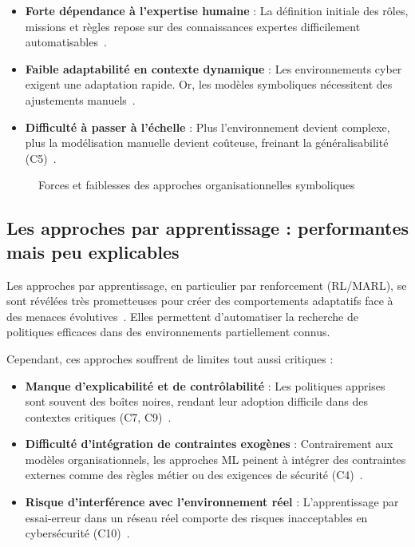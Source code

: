 \documentclass[ twoside,openright,titlepage,numbers=noenddot,headinclude,%
                footinclude=true,cleardoublepage=empty,abstractoff, %
                BCOR=5mm,paper=a4,fontsize=11pt,%
                french,american,%
                ]{scrreprt}
\begin{document}
\begin{itemize}
    \item \textbf{Forte dépendance à l'expertise humaine} : La définition initiale des rôles, missions et règles repose sur des connaissances expertes difficilement automatisables~\cite{Boella2008}.
    \item \textbf{Faible adaptabilité en contexte dynamique} : Les environnements cyber exigent une adaptation rapide. Or, les modèles symboliques nécessitent des ajustements manuels~\cite{Picard2005}.
    \item \textbf{Difficulté à passer à l'échelle} : Plus l'environnement devient complexe, plus la modélisation manuelle devient coûteuse, freinant la généralisabilité (C5)~\cite{Picard2006}.
\end{itemize}

\begin{figure}[H]
    \centering
    \caption{Forces et faiblesses des approches organisationnelles symboliques}
    \label{fig:limits_symbolic}
\end{figure}

\subsection{Les approches par apprentissage : performantes mais peu explicables}

Les approches par apprentissage, en particulier par renforcement (RL/MARL), se sont révélées très prometteuses pour créer des comportements adaptatifs face à des menaces évolutives~\cite{Hammar2023}. Elles permettent d'automatiser la recherche de politiques efficaces dans des environnements partiellement connus.

Cependant, ces approches souffrent de limites tout aussi critiques :

\begin{itemize}
    \item \textbf{Manque d'explicabilité et de contrôlabilité} : Les politiques apprises sont souvent des boîtes noires, rendant leur adoption difficile dans des contextes critiques (C7, C9)~\cite{Gunning2019}.
    \item \textbf{Difficulté d'intégration de contraintes exogènes} : Contrairement aux modèles organisationnels, les approches ML peinent à intégrer des contraintes externes comme des règles métier ou des exigences de sécurité (C4)~\cite{Chouldechova2018}.
    \item \textbf{Risque d'interférence avec l'environnement réel} : L'apprentissage par essai-erreur dans un réseau réel comporte des risques inacceptables en cybersécurité (C10)~\cite{kurniawati2011motion}.
\end{itemize}
\end{document}
